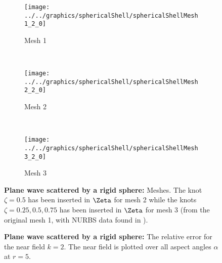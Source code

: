 \begin{figure}
	\centering
	\begin{subfigure}{0.23\textwidth}
		\centering
		\texttt{[image: ../../graphics/sphericalShell/sphericalShellMesh1\_2\_0]}
		\caption{Mesh 1}
    \end{subfigure}
    ~
	\begin{subfigure}{0.23\textwidth}
		\centering
		\texttt{[image: ../../graphics/sphericalShell/sphericalShellMesh2\_2\_0]}
		\caption{Mesh 2}
		\label{Fig2:SphericalShellMeshes2}
    \end{subfigure}
    ~
	\begin{subfigure}{0.23\textwidth}
		\centering
		\texttt{[image: ../../graphics/sphericalShell/sphericalShellMesh3\_2\_0]}
		\caption{Mesh 3}
		\label{Fig2:SphericalShellMeshes3}
    \end{subfigure}
	\caption{\textbf{Plane wave scattered by a rigid sphere:} Meshes. The knot $\zeta=0.5$ has been inserted in $\Zeta$ for mesh 2 while the knots $\zeta = 0.25, 0.5, 0.75$ has been inserted in $\Zeta$ for mesh 3 (from the original mesh 1, with NURBS data found in ).}
	\label{Fig2:SphericalShellMeshes}
\end{figure}

\begin{figure}
	\caption{\textbf{Plane wave scattered by a rigid sphere:} The relative error for the near field  $k=2$. The near field is plotted over all aspect angles $\alpha$ at $r=5$.}
	\label{Fig2:scatteringRigidSphereErrorNearField}
\end{figure}

